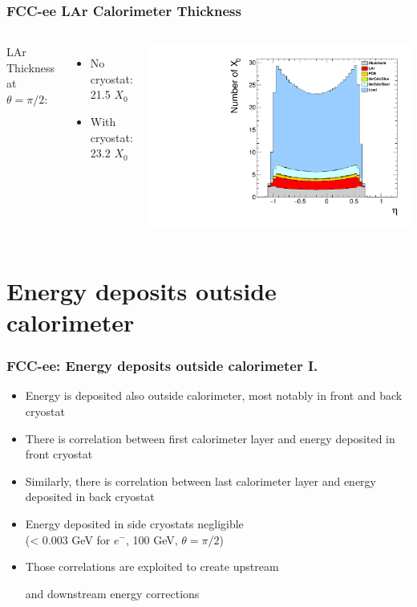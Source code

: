\documentclass{beamer}
\newcommand{\redtext}[1]{%
  \textcolor{myRed}{#1}
}
\begin{document}
\begin{frame}
  \frametitle{FCC-ee LAr Calorimeter Thickness}

  \begin{columns}[c]
    LAr Thickness at $\theta = \pi/2$:
    \begin{itemize}
      \small
      \item No cryostat: 21.5 $X_0$
      \item With cryostat: 23.2 $X_0$
    \end{itemize}

    \includegraphics[width=\linewidth]{figures/x0.pdf}
  \end{columns}
\end{frame}


\section{Energy deposits outside calorimeter}

\begin{frame}
  \frametitle{FCC-ee: Energy deposits outside calorimeter I.}

  \begin{itemize}
    \item Energy is deposited also outside calorimeter, most notably in front
          and back cryostat
    \item There is correlation between first calorimeter layer and energy
          deposited in front cryostat
    \item Similarly, there is correlation between last calorimeter layer and
          energy deposited in back cryostat
    \item Energy deposited in side cryostats negligible \\
          (< 0.003 GeV for $e^{-}$, 100 GeV, $\theta = \pi/2$)
    \item Those correlations are exploited to create \redtext{upstream}
          and \redtext{downstream} energy corrections
  \end{itemize}
\end{frame}
\end{document}
